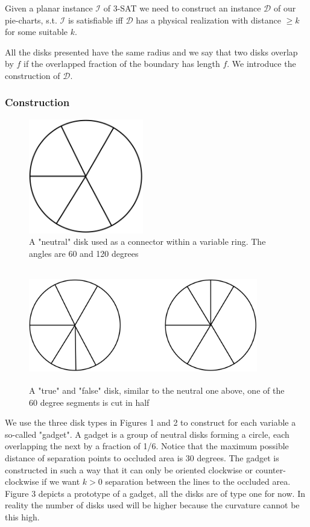 \documentclass[a4paper,11pt]{article}
\begin{document}
Given a planar instance $\mathcal{I}$ of 3-SAT we need to construct an instance $\mathcal{D}$ of our pie-charts, s.t. $\mathcal{I}$ is satisfiable iff $\mathcal{D}$ has a physical realization with distance $\geq k$ for some suitable $k$.

All the disks presented have the same radius and we say that two disks overlap by $f$ if the overlapped fraction of the boundary has length $f$. We introduce the construction of $\mathcal{D}$.

\subsubsection{Construction}
\begin{figure}[h]
\centering
\includegraphics[width=5cm, height=5cm]{assets/np-hardness/neutral.png}
\caption{A "neutral" disk used as a connector within a variable ring. The angles are 60 and 120 degrees}
\end{figure}

\begin{figure}[h]
\centering
\includegraphics[width=10cm, height=5cm]{assets/np-hardness/true_false.png}
\caption{A "true" and "false" disk, similar to the neutral one above, one of the 60 degree segments is cut in half}
\end{figure}

We use the three disk types in Figures 1 and 2 to construct for each variable a so-called "gadget". A gadget is a group of neutral disks forming a circle, each overlapping the next by a fraction of 1/6. Notice that the maximum possible distance of separation points to occluded area is 30 degrees. The gadget is constructed in such a way that it can only be oriented clockwise or counter-clockwise if we want $k>0$ separation between the lines to the occluded area. Figure 3 depicts a prototype of a gadget, all the disks are of type one for now. In reality the number of disks used will be higher because the curvature cannot be this high.
\end{document}
